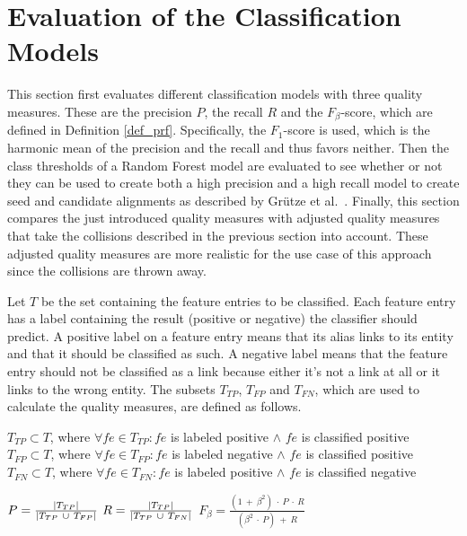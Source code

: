 \section{Evaluation of the Classification Models}
\label{sec:ModelEval}
This section first evaluates different classification models with three quality measures. These are the precision $P$, the recall $R$ and the $F_{\beta}$-score, which are defined in Definition \ref{def_prf}. Specifically, the $F_1$-score is used, which is the harmonic mean of the precision and the recall and thus favors neither. Then the class thresholds of a Random Forest model are evaluated to see whether or not they can be used to create both a high precision and a high recall model to create seed and candidate alignments as described by Grütze et al.\ \cite{coheel}. Finally, this section compares the just introduced quality measures with adjusted quality measures that take the collisions described in the previous section into account. These adjusted quality measures are more realistic for the use case of this approach since the collisions are thrown away.\par
Let $T$ be the set containing the feature entries to be classified. Each feature entry has a label containing the result (positive or negative) the classifier should predict. A positive label on a feature entry means that its alias links to its entity and that it should be classified as such. A negative label means that the feature entry should not be classified as a link because either it's not a link at all or it links to the wrong entity. The subsets $T_{TP}$, $T_{FP}$ and $T_{FN}$, which are used to calculate the quality measures, are defined as follows.\\
\begin{nscenter}
	$T_{TP} \subset T$, where $\forall fe \in T_{TP}: fe$ is labeled positive $\land$ $fe$ is classified positive\\
	$T_{FP} \subset T$, where $\forall fe \in T_{FP}: fe$ is labeled negative $\land$ $fe$ is classified positive\\
	$T_{FN} \subset T$, where $\forall fe \in T_{FN}: fe$ is labeled positive $\land$ $fe$ is classified negative\\
\end{nscenter}
\begin{definition}
$P = \frac{\left|T_{TP}\right|}{\left|T_{TP} \ \cup \ T_{FP}\right|}$
$R = \frac{\left|T_{TP}\right|}{\left|T_{TP} \ \cup \ T_{FN}\right|}$
$F_{\beta} = \frac{(1 \ + \ \beta^2) \ \cdot \ P \ \cdot \ R}{(\beta^2 \ \cdot \ P) \ + \ R}$
\label{def_prf}
\end{definition}
